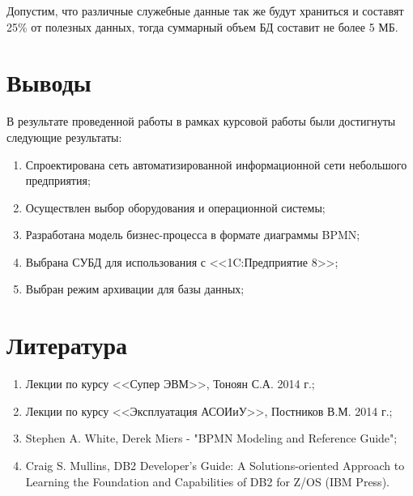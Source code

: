 \documentclass[russian,utf8,emptystyle]{eskdtext}
\begin{document}
Допустим, что различные служебные данные так же будут храниться и составят 25\% от полезных данных, тогда суммарный объем БД составит не более 5 МБ.

\clearpage
\section{Выводы}
В результате проведенной работы в рамках курсовой работы были достигнуты следующие результаты:
\begin{enumerate}[label=\arabic*)]
\item Спроектирована сеть автоматизированной информационной сети небольшого предприятия;
\item Осуществлен выбор оборудования и операционной системы;
\item Разработана модель бизнес-процесса в формате диаграммы BPMN;
\item Выбрана СУБД для использования с <<1C:Предприятие 8>>;
\item Выбран режим архивации для базы данных;
\end{enumerate}

\clearpage
\section{Литература}
\begin{enumerate}[label=\arabic*)]
\item Лекции по курсу <<Супер ЭВМ>>, Тоноян С.А. 2014 г.;
\item Лекции по курсу <<Эксплуатация АСОИиУ>>, Постников В.М. 2014 г.;
\item Stephen A. White, Derek Miers - "BPMN Modeling and Reference Guide";
\item Craig S. Mullins, DB2 Developer's Guide: A Solutions-oriented Approach to Learning the Foundation and Capabilities of DB2 for Z/OS (IBM Press).
\end{enumerate}
\end{document}
